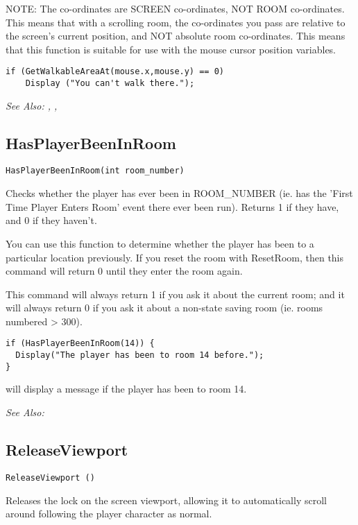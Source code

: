 NOTE: The co-ordinates are SCREEN co-ordinates, NOT ROOM co-ordinates. This
means that with a scrolling room, the co-ordinates you pass are relative to
the screen's current position, and NOT absolute room co-ordinates. This
means that this function is suitable for use with the mouse cursor position
variables.

\begin{verbatim}
if (GetWalkableAreaAt(mouse.x,mouse.y) == 0)
    Display ("You can't walk there.");
\end{verbatim}

\it{See Also:} ,
,


\subsection{HasPlayerBeenInRoom}\label{HasPlayerBeenInRoom}%

\begin{verbatim}
HasPlayerBeenInRoom(int room_number)
\end{verbatim}
Checks whether the player has ever been in ROOM_NUMBER (ie. has the 'First Time Player
Enters Room' event there ever been run). Returns 1 if they have, and 0 if they haven't.

You can use this function to determine whether the player has been to a particular location
previously. If you reset the room with ResetRoom, then this command will return 0 until
they enter the room again.

This command will always return 1 if you ask it about the current room; and it will always
return 0 if you ask it about a non-state saving room (ie. rooms numbered > 300).

\begin{verbatim}
if (HasPlayerBeenInRoom(14)) {
  Display("The player has been to room 14 before.");
}
\end{verbatim}
will display a message if the player has been to room 14.

\it{See Also:} 


\subsection{ReleaseViewport}\label{ReleaseViewport}%

\begin{verbatim}
ReleaseViewport ()
\end{verbatim}
Releases the lock on the screen viewport, allowing it to automatically
scroll around following the player character as normal.


